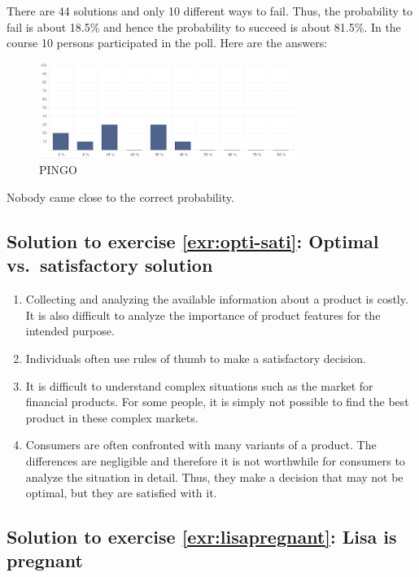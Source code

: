 \documentclass[
  12pt,
  oneside]{book}
\providecommand{\tightlist}{%
  \setlength{\itemsep}{0pt}\setlength{\parskip}{0pt}}
\theoremstyle{definition}
\theoremstyle{definition}
\theoremstyle{definition}
\theoremstyle{definition}
\theoremstyle{remark}
\begin{document}
There are 44 solutions and only 10 different ways to fail. Thus, the probability to fail is about 18.5\% and hence the probability to succeed is about 81.5\%. In the course 10 persons participated in the poll. Here are the answers:

\begin{figure}
\centering
\includegraphics[width=0.75\textwidth,height=\textheight]{fig/nikolaus-poll.png}
\caption{\label{fig:nikolaus-poll} PINGO}
\end{figure}

Nobody came close to the correct probability.

\hypertarget{sol:opti-sati}{%
\subsection*{Solution to exercise \ref{exr:opti-sati}: Optimal vs.~satisfactory solution}\label{sol:opti-sati}}

\begin{enumerate}
\def\labelenumi{\Alph{enumi})}
\tightlist
\item
  Collecting and analyzing the available information about a product is costly. It is also difficult to analyze the importance of product features for the intended purpose.
\item
  Individuals often use rules of thumb to make a satisfactory decision.
\item
  It is difficult to understand complex situations such as the market for financial products. For some people, it is simply not possible to find the best product in these complex markets.
\item
  Consumers are often confronted with many variants of a product. The differences are negligible and therefore it is not worthwhile for consumers to analyze the situation in detail. Thus, they make a decision that may not be optimal, but they are satisfied with it.
\end{enumerate}

\hypertarget{sol:lisapregnant}{%
\subsection*{Solution to exercise \ref{exr:lisapregnant}: Lisa is pregnant}\label{sol:lisapregnant}}
\end{document}
